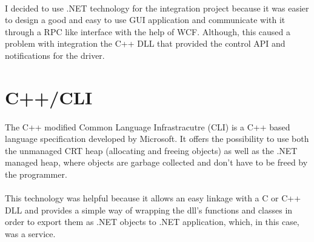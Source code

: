         \paragraph{}
        I decided to use .NET technology for the integration project because it was easier to design a good and easy to use GUI application and
        communicate with it through a RPC like interface with the help of WCF. Although, this caused a problem with integration the C++ DLL that
        provided the control API and notifications for the driver.

    \section{C++/CLI}
        \paragraph{}
        The C++ modified Common Language Infrastracutre (CLI) is a C++ based language specification developed by Microsoft. It offers the possibility
        to use both the unmanaged CRT heap (allocating and freeing objects) as well as the .NET managed heap, where objects are garbage collected
        and don't have to be freed by the programmer.
        
        \paragraph{}
        This technology was helpful because it allows an easy linkage with a C or C++ DLL and provides a simple way of wrapping the dll's
        functions and classes in order to export them as .NET objects to .NET application, which, in this case, was a service.
    
